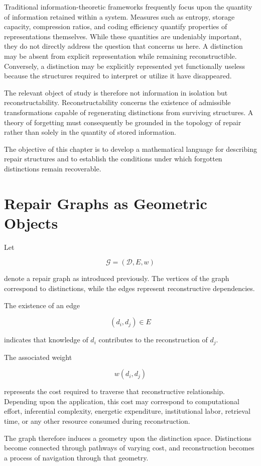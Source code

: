 \documentclass[12pt,oneside]{book}
\theoremstyle{plain} \newtheorem{theorem}{Theorem}[chapter] \newtheorem{lemma}[theorem]{Lemma} \newtheorem{proposition}[theorem]{Proposition} \newtheorem{corollary}[theorem]{Corollary}
\theoremstyle{definition} \newtheorem{definition}[theorem]{Definition} \newtheorem{axiom}[theorem]{Axiom} \newtheorem{construction}[theorem]{Construction}
\theoremstyle{remark} \newtheorem{remark}[theorem]{Remark} \newtheorem{example}[theorem]{Example}
\newcommand{\D}{\mathcal{D}} \newcommand{\R}{\mathcal{R}} \newcommand{\F}{\mathcal{F}} \newcommand{\U}{\mathcal{U}} \newcommand{\M}{\mathcal{M}} \newcommand{\G}{\Gamma}
\begin{document}
Traditional information-theoretic frameworks frequently focus upon the quantity of information retained within a system. Measures such as entropy, storage capacity, compression ratios, and coding efficiency quantify properties of representations themselves. While these quantities are undeniably important, they do not directly address the question that concerns us here. A distinction may be absent from explicit representation while remaining reconstructible. Conversely, a distinction may be explicitly represented yet functionally useless because the structures required to interpret or utilize it have disappeared.

The relevant object of study is therefore not information in isolation but reconstructability. Reconstructability concerns the existence of admissible transformations capable of regenerating distinctions from surviving structures. A theory of forgetting must consequently be grounded in the topology of repair rather than solely in the quantity of stored information.

The objective of this chapter is to develop a mathematical language for describing repair structures and to establish the conditions under which forgotten distinctions remain recoverable.

\section{Repair Graphs as Geometric Objects}

Let

\[
\mathcal G=(\D,E,w)
\]

denote a repair graph as introduced previously. The vertices of the graph correspond to distinctions, while the edges represent reconstructive dependencies.

The existence of an edge

\[
(d_i,d_j)
\in E
\]

indicates that knowledge of $d_i$ contributes to the reconstruction of $d_j$.

The associated weight

\[
w(d_i,d_j)
\]

represents the cost required to traverse that reconstructive relationship. Depending upon the application, this cost may correspond to computational effort, inferential complexity, energetic expenditure, institutional labor, retrieval time, or any other resource consumed during reconstruction.

The graph therefore induces a geometry upon the distinction space. Distinctions become connected through pathways of varying cost, and reconstruction becomes a process of navigation through that geometry.
\end{document}
